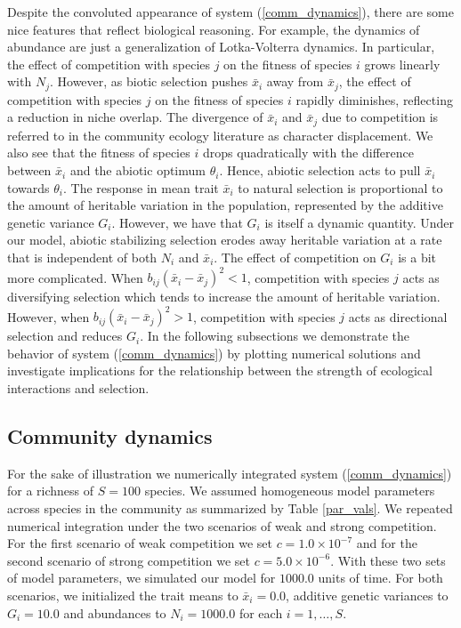 \documentclass[]{article}
\begin{document}
Despite the convoluted appearance of system (\ref{comm_dynamics}), there
are some nice features that reflect biological reasoning. For example,
the dynamics of abundance are just a generalization of Lotka-Volterra
dynamics. In particular, the effect of competition with species \(j\) on
the fitness of species \(i\) grows linearly with \(N_j\). However, as
biotic selection pushes \(\bar x_i\) away from \(\bar x_j\), the effect
of competition with species \(j\) on the fitness of species \(i\)
rapidly diminishes, reflecting a reduction in niche overlap. The
divergence of \(\bar x_i\) and \(\bar x_j\) due to competition is
referred to in the community ecology literature as character
displacement. We also see that the fitness of species \(i\) drops
quadratically with the difference between \(\bar x_i\) and the abiotic
optimum \(\theta_i\). Hence, abiotic selection acts to pull \(\bar x_i\)
towards \(\theta_i\). The response in mean trait \(\bar x_i\) to natural
selection is proportional to the amount of heritable variation in the
population, represented by the additive genetic variance \(G_i\).
However, we have that \(G_i\) is itself a dynamic quantity. Under our
model, abiotic stabilizing selection erodes away heritable variation at
a rate that is independent of both \(N_i\) and \(\bar x_i\). The effect
of competition on \(G_i\) is a bit more complicated. When
\(b_{ij}(\bar x_i-\bar x_j)^2<1\), competition with species \(j\) acts
as diversifying selection which tends to increase the amount of
heritable variation. However, when \(b_{ij}(\bar x_i-\bar x_j)^2>1\),
competition with species \(j\) acts as directional selection and reduces
\(G_i\). In the following subsections we demonstrate the behavior of
system (\ref{comm_dynamics}) by plotting numerical solutions and
investigate implications for the relationship between the strength of
ecological interactions and selection.

\hypertarget{community-dynamics}{%
\subsection{\texorpdfstring{Community dynamics
\label{dynamics}}{Community dynamics }}\label{community-dynamics}}

For the sake of illustration we numerically integrated system
(\ref{comm_dynamics}) for a richness of \(S=100\) species. We assumed
homogeneous model parameters across species in the community as
summarized by Table \ref{par_vals}. We repeated numerical integration
under the two scenarios of weak and strong competition. For the first
scenario of weak competition we set \(c=1.0\times10^{-7}\) and for the
second scenario of strong competition we set \(c=5.0\times10^{-6}\).
With these two sets of model parameters, we simulated our model for
\(1000.0\) units of time. For both scenarios, we initialized the trait
means to \(\bar x_i=0.0\), additive genetic variances to \(G_i=10.0\)
and abundances to \(N_i=1000.0\) for each \(i=1,\dots,S\).
\end{document}
